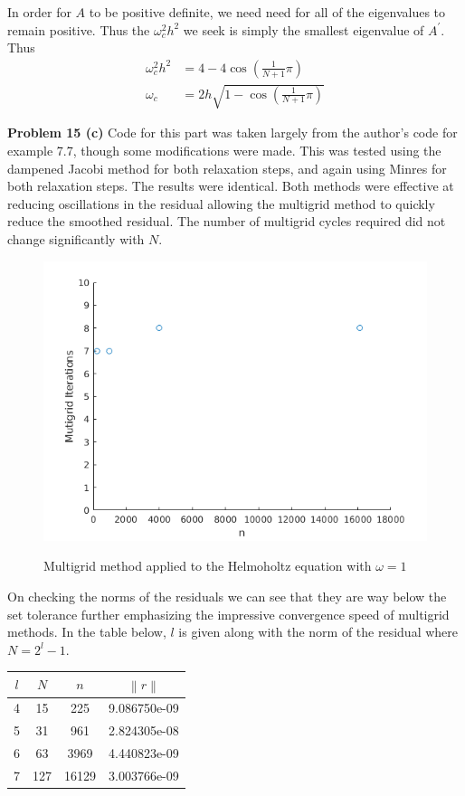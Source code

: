 \documentclass[12pt]{article}
\newcommand{\problem}[1]{\hspace{-4 ex} \large \textbf{Problem #1} }
\newcommand{\norm}[1]{\left\lVert#1\right\rVert}
\begin{document}
In order for $A$ to be positive definite, we need need for all of the eigenvalues to remain positive. Thus the $\omega_c^2h^2$ we seek is simply the smallest eigenvalue of $A^\prime$. Thus
\begin{align*}
	\omega_c^2h^2 & = 4 - 4 \cos\left(\frac{1 }{N+1}\pi \right) \\
	\omega_c & = 2h \sqrt{1- \cos\left(\frac{1 }{N+1}\pi \right)}
\end{align*}

\bigbreak

\problem{15 (c)} Code for this part was taken largely from the author's code for example 7.7, though some modifications were made. This was tested using the dampened Jacobi method for both relaxation steps, and again using Minres for both relaxation steps. The results were identical. Both methods were effective at reducing oscillations in the residual allowing the multigrid method to quickly reduce the smoothed residual. The number of multigrid cycles required did not change significantly with $N$.

\begin{figure}[H]
	\caption{Multigrid method applied to the Helmoholtz equation with $\omega = 1$}
	\includegraphics[width=.75\textwidth]{hwch7_figure_4_multigrid_w1_jacobi}
	\label{multigrid}
	\centering
\end{figure}

On checking the norms of the residuals we can see that they are way below the set tolerance further emphasizing the impressive convergence speed of multigrid methods. In the table below, $l$ is given along with the norm of the residual where $N = 2^l-1$.

	\begin{center}
		\begin{tabular}{|c|c|c|c|}
			\hline
			$l$ & $N$ & $n$ & $\norm{r}$\\ \hline
			4& 15 & 225 & 9.086750e-09\\ \hline
			5& 31 & 961 & 2.824305e-08\\ \hline
			6& 63 & 3969 & 4.440823e-09\\ \hline
			7& 127 & 16129 & 3.003766e-09\\ \hline
		\end{tabular}
	\end{center}
\end{document}
